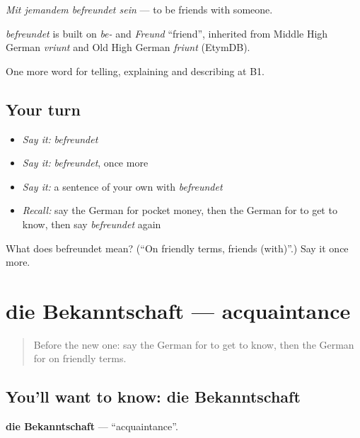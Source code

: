 \emph{Mit jemandem befreundet sein} — to be friends with someone.

\begin{cousinweb}
\emph{befreundet} is built on \emph{be-} and \emph{Freund} \textquotedblleft{}friend\textquotedblright{}, inherited from Middle High German \emph{vriunt} and Old High German \emph{friunt} (EtymDB).
\end{cousinweb}

\begin{grammarlens}[title={What you've built}]
One more word for telling, explaining and describing at B1.
\end{grammarlens}

\subsection*{Your turn}
\begin{itemize}
\raggedright
  \item \emph{Say it:} \emph{befreundet}
  \item \emph{Say it:} \emph{befreundet}, once more
  \item \emph{Say it:} a sentence of your own with \emph{befreundet}
  \item \emph{Recall:} say the German for pocket money, then the German for to get to know, then say \emph{befreundet} again
\end{itemize}

\begin{tcolorbox}[breakable,colback=teal!4,colframe=teal!35!black,title={Before you move on}]
What does befreundet mean? (\textquotedblleft{}On friendly terms, friends (with)\textquotedblright{}.) Say it once more.
\end{tcolorbox}
\section[die Bekanntschaft]{die Bekanntschaft — acquaintance}

\label{lesson:GE-C498-bekanntschaft}



\begin{quote}
Before the new one: say the German for to get to know, then the German for on friendly terms.
\end{quote}

\subsection*{You'll want to know: die Bekanntschaft}
\textbf{die Bekanntschaft} — \textquotedblleft{}acquaintance\textquotedblright{}.

